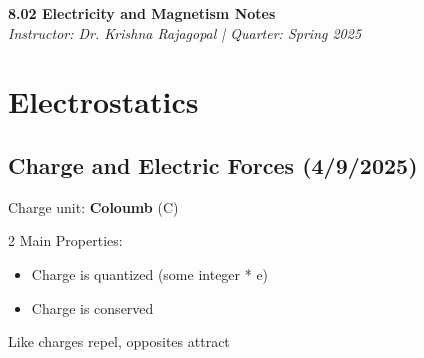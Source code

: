 \documentclass[12pt]{article}
\begin{document}
\begin{center}
    {\LARGE \textbf{8.02 Electricity and Magnetism Notes}} \\
    \vspace{0.5em}
    {\large \textit{Instructor: Dr. Krishna Rajagopal \quad | \quad Quarter: Spring 2025}} \\
    \vspace{0.5em}
\end{center}

\tableofcontents
\newpage


\section{Electrostatics}

\subsection{Charge and Electric Forces (4/9/2025)}

Charge unit: \textbf{Coloumb} (C) 

2 Main Properties:
\begin{itemize}
    \item Charge is quantized (some integer * e)
    \item Charge is conserved
\end{itemize}

Like charges repel, opposites attract
\end{document}
